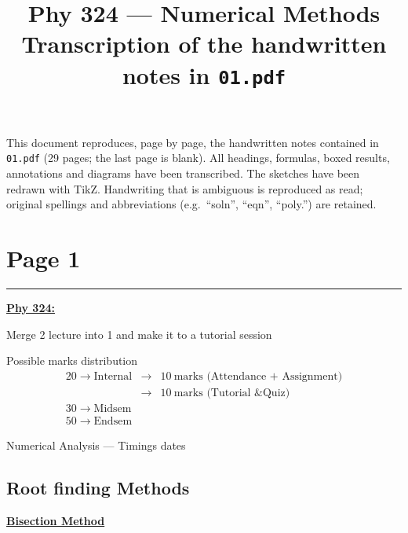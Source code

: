 \documentclass[11pt,a4paper]{article}
\title{\vspace{-1.5cm}\textbf{Phy 324 --- Numerical Methods}\\[4pt]
\large Transcription of the handwritten notes in \texttt{01.pdf}}
\author{}
\date{}
\newcommand{\pagehead}[1]{%
  \clearpage
  \section*{Page #1}
  \vspace{-0.6em}
  {\color{black!45}\rule{\linewidth}{0.5pt}}
  \vspace{0.4em}
}
\begin{document}
\maketitle
\vspace{-0.8cm}

\begin{notebox}
This document reproduces, page by page, the handwritten notes contained in
\texttt{01.pdf} (29 pages; the last page is blank). All headings, formulas,
boxed results, annotations and diagrams have been transcribed. The sketches
have been redrawn with TikZ. Handwriting that is ambiguous is reproduced as
read; original spellings and abbreviations (e.g.\ ``soln'', ``eqn'',
``poly.'') are retained.
\end{notebox}

\pagehead{1}

\textbf{\underline{Phy 324:}}

Merge 2 lecture into 1 and make it to a tutorial session

Possible marks distribution
\[
\begin{array}{rcl}
20 \to \text{Internal} & \longrightarrow & 10\ \text{marks (Attendance + Assignment)}\\[2pt]
                       & \longrightarrow & 10\ \text{marks (Tutorial \& Quiz)}\\[6pt]
30 \to \text{Midsem}\\[2pt]
50 \to \text{Endsem}
\end{array}
\]

Numerical Analysis --- Timings dates

\subsection*{Root finding Methods}

\textbf{\underline{Bisection Method}}

\begin{center}
\end{center}
\end{document}
